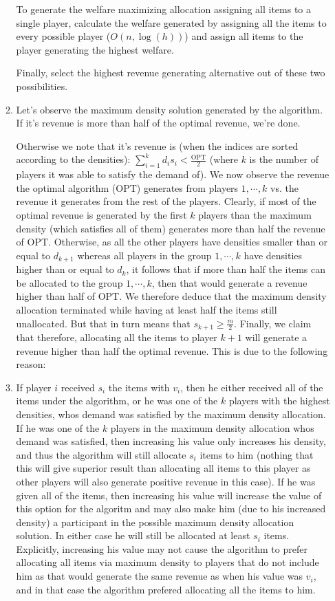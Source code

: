 \documentclass[a4page,notitlepage]{article}
\begin{document}
\begin{enumerate}
\begin{enumerate}
    To generate the welfare maximizing allocation assigning all items to a single player, calculate the welfare generated by assigning all the items to every possible player ($O(n,\log(h))$) and assign all items to the player generating the highest welfare.
    
    Finally, select the highest revenue generating alternative out of
    these two possibilities.
    \item
      Let's observe the maximum density solution generated by the algorithm.
      If it's revenue is more than half of the optimal revenue, we're done.
      
      Otherwise we note that it's revenue is (when the indices are sorted according to the densities): $\sum_{i=1}^kd_is_i<\frac{\text{OPT}}{2}$ (where $k$ is the number of players it was able to satisfy the demand of).
      We now observe the revenue the optimal algorithm (OPT) generates from players ${1,\cdots,k}$ vs. the revenue it generates from the rest of the players.
      Clearly, if most of the optimal revenue is generated by the first $k$ players than the maximum density (which satisfies all of them) generates more than half the revenue of OPT.
      Otherwise, as all the other players have densities smaller than or equal to $d_{k+1}$ whereas all players in the group ${1,\cdots,k}$ have densities higher than or equal to $d_k$, it follows that if more than half the items can be allocated to the group ${1,\cdots,k}$, then that would generate a revenue higher than half of OPT.
      We therefore deduce that the maximum density allocation terminated while having at least half the items still unallocated.
      But that in turn means that $s_{k+1}\geq\frac{m}{2}$.
      Finally, we claim that therefore, allocating all the items to player $k+1$ will generate a revenue higher than half the optimal revenue.
      This is due to the following reason:
      \item
      If player $i$ received $s_i$ the items with $v_i$, then he either received all of the items under the algorithm, or he was one of the $k$ players with the highest densities, whos demand was satisfied by the maximum density allocation.
      If he was one of the $k$ players in the maximum density allocation whos demand was satisfied, then increasing his value only increases his density, and thus the algorithm will still allocate $s_i$ items to him (nothing that this will give superior result than allocating all items to this player as other players will also generate positive revenue in this case).
      If he was given all of the items, then increasing his value will increase the value of this option for the algoritm and may also make him (due to his increased density) a participant in the possible maximum density allocation solution.
      In either case he will still be allocated at least $s_i$ items.
      Explicitly, increasing his value may not cause the algorithm to prefer allocating all items via maximum density to players that do not include him as that would generate the same revenue as when his value was $v_i$, and in that case the algorithm prefered allocating all the items to him.
      

\end{enumerate}
\end{enumerate}
\end{document}
